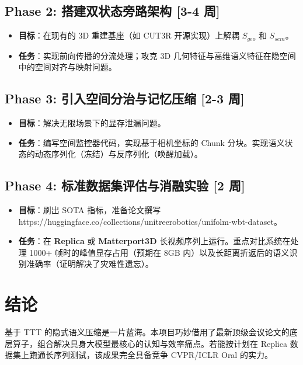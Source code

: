\documentclass[12pt, a4paper]{article}
\begin{document}
\subsection*{Phase 2: 搭建双状态旁路架构 [3-4 周]}
\begin{itemize}
    \item \textbf{目标}：在现有的 3D 重建基座（如 CUT3R 开源实现）上解耦 $S_{geo}$ 和 $S_{sem}$。
    \item \textbf{任务}：实现前向传播的分流处理；攻克 3D 几何特征与高维语义特征在隐空间中的空间对齐与映射问题。
\end{itemize}

\subsection*{Phase 3: 引入空间分治与记忆压缩 [2-3 周]}
\begin{itemize}
    \item \textbf{目标}：解决无限场景下的显存泄漏问题。
    \item \textbf{任务}：编写空间监控器代码，实现基于相机坐标的 Chunk 分块。实现语义状态的动态序列化（冻结）与反序列化（唤醒加载）。
\end{itemize}

\subsection*{Phase 4: 标准数据集评估与消融实验 [2 周]}
\begin{itemize}
    \item \textbf{目标}：刷出 SOTA 指标，准备论文撰写 https://huggingface.co/collections/unitreerobotics/unifolm-wbt-dataset。
    \item \textbf{任务}：在 \textbf{Replica} 或 \textbf{Matterport3D} 长视频序列上运行。重点对比系统在处理 1000+ 帧时的峰值显存占用（预期在 8GB 内）以及长距离折返后的语义识别准确率（证明解决了灾难性遗忘）。
\end{itemize}

\section{结论}
基于 TTT 的隐式语义压缩是一片蓝海。本项目巧妙借用了最新顶级会议论文的底层算子，组合解决具身大模型最核心的认知与效率痛点。若能按计划在 Replica 数据集上跑通长序列测试，该成果完全具备竞争 CVPR/ICLR Oral 的实力。
\end{document}
